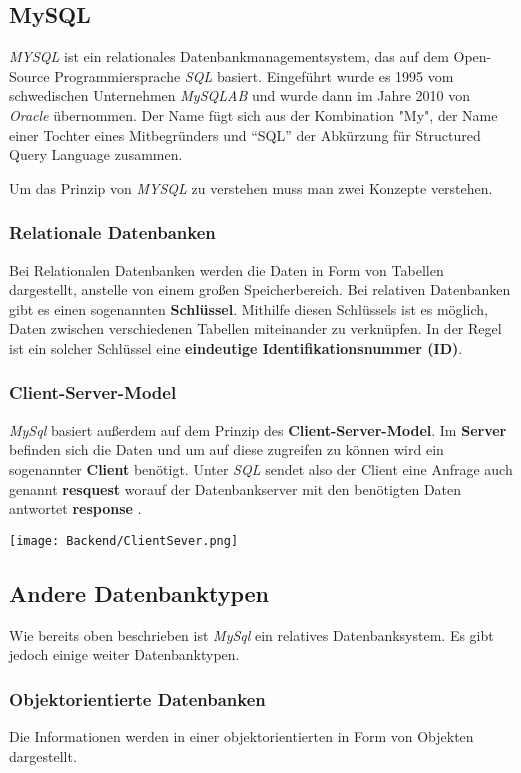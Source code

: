 \subsection{MySQL}

\textit{MYSQL} ist ein relationales Datenbankmanagementsystem, das auf dem Open-Source
Programmiersprache \textit{SQL} basiert. Eingeführt wurde es 1995 vom schwedischen Unternehmen
\textit{MySQLAB} und wurde dann im Jahre 2010 von \textit{Oracle} übernommen. Der Name fügt sich
aus der Kombination "My", der Name einer Tochter eines Mitbegründers und ``SQL'' der Abkürzung
für Structured Query Language zusammen.

Um das Prinzip von \textit{MYSQL} zu verstehen muss man zwei Konzepte verstehen.

\subsubsection{Relationale Datenbanken}
Bei Relationalen Datenbanken werden die Daten in Form von Tabellen dargestellt, anstelle von
einem großen Speicherbereich.
Bei relativen Datenbanken gibt es einen sogenannten \textbf{Schlüssel}. Mithilfe diesen Schlüssels
ist es möglich, Daten zwischen verschiedenen Tabellen miteinander zu verknüpfen. In der Regel ist
ein solcher Schlüssel eine \textbf{eindeutige Identifikationsnummer (ID)}.
\subsubsection{Client-Server-Model}
\textit{MySql} basiert außerdem auf dem Prinzip des \textbf{Client-Server-Model}. Im \textbf{Server}
befinden sich die Daten und um auf diese zugreifen zu können wird ein sogenannter \textbf{Client}
benötigt. Unter \textit{SQL} sendet also der Client eine Anfrage auch genannt \textbf{resquest}
worauf der Datenbankserver mit den benötigten Daten antwortet \textbf{response} .

\texttt{[image: Backend/ClientSever.png]}

\subsection{Andere Datenbanktypen}
Wie bereits oben beschrieben ist \textit{MySql} ein relatives Datenbanksystem. Es gibt
jedoch einige weiter Datenbanktypen.

\subsubsection{Objektorientierte Datenbanken}
Die Informationen werden in einer objektorientierten in Form von Objekten dargestellt.

